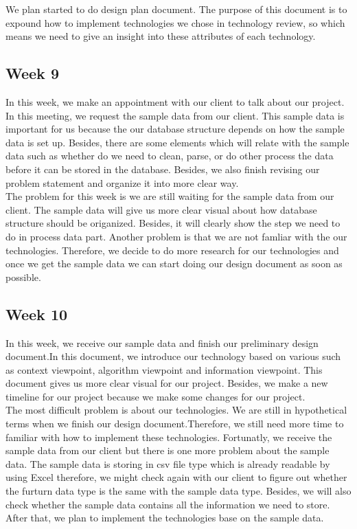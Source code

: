 \noindent We plan started to do design plan document. The purpose of this document is to expound how to implement technologies we chose in technology review, so which means we need to give an insight into these attributes of each technology. 


\subsection{Week 9}
\noindent In this week, we make an appointment with our client to talk about our project. In this meeting, we request the sample data from our client. This sample data is important for us because the our database structure depends on how the sample data is set up. Besides, there are some elements which will relate with the sample data such as whether do we need to clean, parse, or do other process the data before it can be stored in the database. Besides, we also finish revising our problem statement and organize it into more clear way.\\

\noindent The problem for this week is we are still waiting for the sample data from our client. The sample data will give us more clear visual about how database structure should be origanized. Besides, it will clearly show the step we need to do in process data part. Another problem is that we are not famliar with the our technologies. Therefore, we decide to do more research for our technologies and once we get the sample data we can start doing our design document as soon as possible.

\subsection{Week 10}
\noindent  In this week, we receive our sample data and finish our preliminary design document.In this document, we introduce our technology based on various such as context viewpoint, algorithm viewpoint and information viewpoint. This document gives us more clear visual for our project. Besides, we make a new timeline for our project because we make some changes for our project.\\

\noindent The most difficult problem is  about our technologies. We are still in hypothetical terms when we finish our design document.Therefore, we still need more time to familiar with how to implement these technologies. Fortunatly, we receive the sample data from our client but there is one more problem about the sample data. The sample data is storing in csv file type which is already readable by using Excel therefore, we might check again with our client to figure out whether the furturn data type is the same with the sample data type. Besides, we will also check whether the sample data contains all the information we need to store. After that, we plan to implement the technologies base on the sample data.

